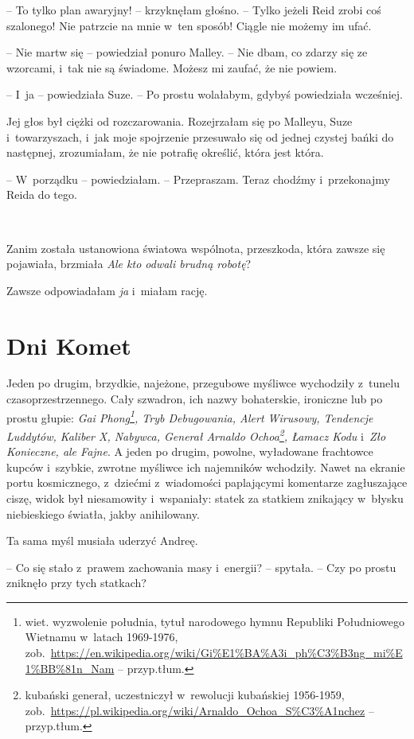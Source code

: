 \documentclass[oneside,polish,11pt,sfheadings]{mwbk}
\begin{document}
-- To tylko plan awaryjny! -- krzyknęłam głośno. -- Tylko jeżeli Reid zrobi
coś szalonego! Nie patrzcie na mnie w~ten sposób! Ciągle nie możemy im
ufać.

-- Nie martw się -- powiedział ponuro Malley. -- Nie dbam, co zdarzy się ze
wzorcami, i~tak nie są świadome. Możesz mi zaufać, że nie powiem.

-- I~ja -- powiedziała Suze. -- Po prostu wolałabym, gdybyś powiedziała
wcześniej.

Jej głos był ciężki od rozczarowania. Rozejrzałam się po Malleyu, Suze i~towarzyszach, i~jak moje spojrzenie przesuwało się od jednej czystej
bańki do następnej, zrozumiałam, że nie potrafię określić, która jest
która.

-- W~porządku -- powiedziałam. -- Przepraszam. Teraz chodźmy i~przekonajmy
Reida do tego.

~

Zanim została ustanowiona światowa wspólnota, przeszkoda, która zawsze
się pojawiała, brzmiała \textit{Ale kto odwali brudną robotę}?

Zawsze odpowiadałam \textit{ja} i~miałam rację.


\chapter{Dni Komet}

Jeden po drugim, brzydkie, najeżone, przegubowe myśliwce wychodziły z~tunelu czasoprzestrzennego. Cały szwadron, ich nazwy bohaterskie,
ironiczne lub po prostu głupie: \textit{Gai Phong\footnote{ wiet. wyzwolenie
południa, tytuł narodowego hymnu Republiki Południowego Wietnamu w~latach 1969-1976,
zob.~\url{https://en.wikipedia.org/wiki/Gi\%E1\%BA\%A3i\_ph\%C3\%B3ng\_mi\%E1\%BB\%81n\_Nam}
-- przyp.tłum.}, Tryb Debugowania, Alert Wirusowy, Tendencje Luddytów,
Kaliber X, Nabywca, Generał Arnaldo Ochoa\footnote{ kubański generał,
uczestniczył w~rewolucji kubańskiej 1956-1959,
zob.~\url{https://pl.wikipedia.org/wiki/Arnaldo\_Ochoa\_S\%C3\%A1nchez}
-- przyp.tłum.}, Łamacz Kodu} i~\textit{Zło Konieczne, ale Fajne}. A jeden
po drugim, powolne, wyładowane frachtowce kupców i~szybkie, zwrotne
myśliwce ich najemników wchodziły. Nawet na ekranie portu kosmicznego, z~dziećmi z~wiadomości paplającymi komentarze zagłuszające ciszę, widok
był niesamowity i~wspaniały: statek za statkiem znikający w~błysku
niebieskiego światła, jakby anihilowany.

Ta sama myśl musiała uderzyć Andreę. 

-- Co się stało z~prawem zachowania
masy i~energii? -- spytała. -- Czy po prostu zniknęło przy tych statkach?
\end{document}
